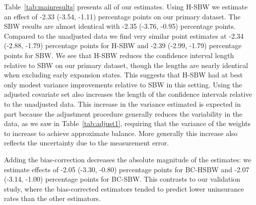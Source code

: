 \documentclass[aoas]{imsart}
\theoremstyle{plain}
\theoremstyle{remark}
\begin{document}
Table~\ref{tab:mainresults} presents all of our estimates. Using H-SBW we estimate an effect of -2.33 (-3.54, -1.11) percentage points on our primary dataset. The SBW results are almost identical with -2.35 (-3.76, -0.95) percentage points. Compared to the unadjusted data we find very similar point estimates at -2.34 (-2.88, -1.79) percentage points for H-SBW and -2.39 (-2.99, -1.79) percentage points for SBW. We see that H-SBW reduces the confidence interval length relative to SBW on our primary dataset, though the lengths are nearly identical when excluding early expansion states. This suggests that H-SBW had at best only modest variance improvements relative to SBW in this setting. Using the adjusted covariate set also increases the length of the confidence intervals relative to the unadjusted data. This increase in the variance estimated is expected in part because the adjustment procedure generally reduces the variability in the data, as we saw in Table~\ref{tab:adjust1}, requiring that the variance of the weights to increase to achieve approximate balance. More generally this increase also reflects the uncertainty due to the measurement error.

Adding the bias-correction decreases the absolute magnitude of the estimates: we estimate effects of -2.05 (-3.30, -0.80) percentage points for BC-HSBW and -2.07 (-3.14, -1.00) percentage points for BC-SBW. This contrasts to our validation study, where the bias-corrected estimators tended to predict lower uninsurance rates than the other estimators. 
\end{document}
